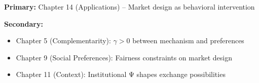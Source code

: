 \begin{tcolorbox}[colback=green!5!white,colframe=green!75!black,title=Chapter Linkage]
\textbf{Primary:} Chapter 14 (Applications) -- Market design as behavioral intervention

\textbf{Secondary:}
\begin{itemize}
    \item Chapter 5 (Complementarity): $\gamma > 0$ between mechanism and preferences
    \item Chapter 9 (Social Preferences): Fairness constraints on market design
    \item Chapter 11 (Context): Institutional Ψ shapes exchange possibilities
\end{itemize}
\end{tcolorbox}

\begin{abstract}
This appendix integrates Alvin E. Roth's research on market design and matching theory into the Evidence-Based Framework. Roth's work demonstrates how economic theory can be applied as ``engineering'' to design institutions that improve welfare. His contributions span matching markets (labor, school choice), kidney exchange, and the concept of repugnance as a constraint on markets. We formalize six core axioms (RO-1 to RO-6) that connect market design principles to EBF's institutional context dimension ($\Psi_I$). Key insight: Markets are not natural phenomena but designed institutions where $\gamma > 0$ between mechanism properties and participant behavior determines success or failure. Nobel Prize 2012 (with Lloyd Shapley).
\end{abstract}

